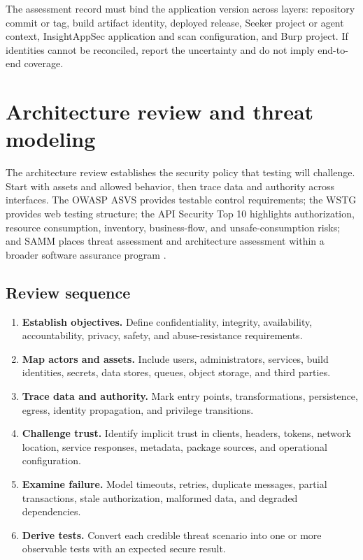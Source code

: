 \documentclass[11pt,letterpaper]{article}
\begin{document}
\begin{evidencebox}
The assessment record must bind the application version across layers: repository commit or tag, build artifact identity, deployed release, Seeker project or agent context, InsightAppSec application and scan configuration, and Burp project. If identities cannot be reconciled, report the uncertainty and do not imply end-to-end coverage.
\end{evidencebox}

\section{Architecture review and threat modeling}

The architecture review establishes the security policy that testing will challenge. Start with assets and allowed behavior, then trace data and authority across interfaces. The OWASP ASVS provides testable control requirements; the WSTG provides web testing structure; the API Security Top 10 highlights authorization, resource consumption, inventory, business-flow, and unsafe-consumption risks; and SAMM places threat assessment and architecture assessment within a broader software assurance program \citep{owaspasvs,owaspwstg,owaspapi,owaspsamm}.

\subsection{Review sequence}

\begin{enumerate}
  \item \textbf{Establish objectives.} Define confidentiality, integrity, availability, accountability, privacy, safety, and abuse-resistance requirements.
  \item \textbf{Map actors and assets.} Include users, administrators, services, build identities, secrets, data stores, queues, object storage, and third parties.
  \item \textbf{Trace data and authority.} Mark entry points, transformations, persistence, egress, identity propagation, and privilege transitions.
  \item \textbf{Challenge trust.} Identify implicit trust in clients, headers, tokens, network location, service responses, metadata, package sources, and operational configuration.
  \item \textbf{Examine failure.} Model timeouts, retries, duplicate messages, partial transactions, stale authorization, malformed data, and degraded dependencies.
  \item \textbf{Derive tests.} Convert each credible threat scenario into one or more observable tests with an expected secure result.
\end{enumerate}
\end{document}
